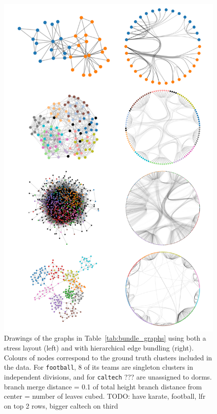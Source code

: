 \begin{figure}
    \centering
    \includegraphics[height=.9\textheight]{power/bundled.pdf}
    \caption[Final hierarchical edge bundled diagrams]{Drawings of the graphs in Table~\ref{tab:bundle_graphs} using both a stress layout (left) and with hierarchical edge bundling (right). Colours of nodes correspond to the ground truth clusters included in the data.
    For \texttt{football}, 8 of its teams are singleton clusters in independent divisions, and for \texttt{caltech} ??? are unassigned to dorms.
    branch merge distance = 0.1 of total height
    branch distance from center = number of leaves cubed.
    TODO: have karate, football, lfr on top 2 rows, bigger caltech on third}
    \label{fig:untangled_hairballs}
\end{figure}

